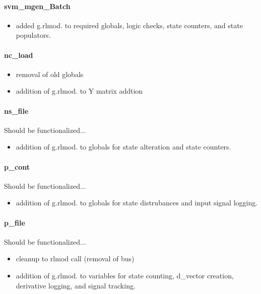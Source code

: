 \documentclass[12pt]{article}
\begin{document}
\paragraph{svm\_mgen\_Batch}
	\begin{itemize}
		\item added g.rlmod. to required globals, logic checks, state counters, and state populators.
	\end{itemize}

\paragraph{nc\_load}
	\begin{itemize}
		\item removal of old globals
		\item addition of g.rlmod. to Y matrix addtion
	\end{itemize}

\paragraph{ns\_file}
Should be functionalized...
	\begin{itemize}
		\item addition of g.rlmod. to globals for state alteration and state counters.
	\end{itemize}

\paragraph{p\_cont}
Should be functionalized...
	\begin{itemize}
		\item addition of g.rlmod. to globals for state distrubances and input signal logging.
	\end{itemize}

\paragraph{p\_file}
Should be functionalized...
	\begin{itemize}
		\item cleanup to rlmod call (removal of bus)
		\item addition of g.rlmod. to variables for state counting, d\_vector creation, derivative logging, and signal tracking.
	\end{itemize}
\end{document}
